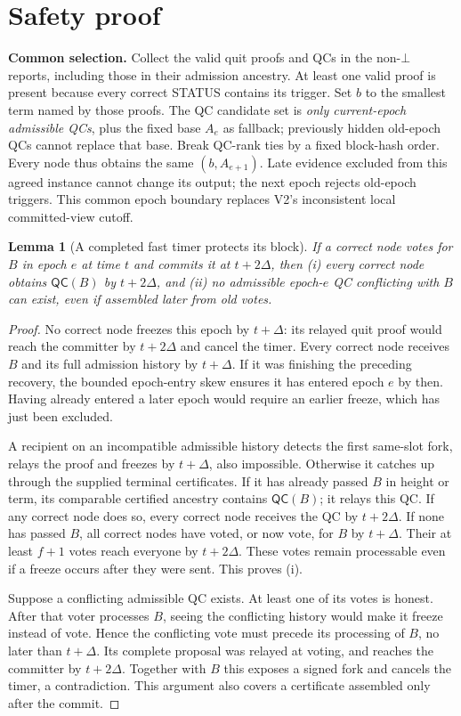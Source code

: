 \documentclass[10pt,a4paper]{article}
\newcommand{\QC}{\mathsf{QC}}
\newtheorem{lemma}{Lemma}
\begin{document}
\clearpage
\section*{Safety proof}
\textbf{Common selection.} Collect the valid quit proofs and QCs in the
non-$\bot$ reports, including those in their admission ancestry. At least one
valid proof is present because every correct STATUS contains its trigger.
Set $b$ to the smallest term named by those proofs. The QC candidate set is
\emph{only current-epoch admissible QCs}, plus the fixed base $A_e$ as fallback;
previously hidden old-epoch QCs cannot replace that base. Break QC-rank ties
by a fixed block-hash order. Every node thus obtains the same $(b,A_{e+1})$.
Late evidence excluded from this agreed instance cannot change its output;
the next epoch rejects old-epoch triggers. This common epoch boundary
replaces V2's inconsistent local committed-view cutoff.

\begin{lemma}[A completed fast timer protects its block]\label{lem:timer}
If a correct node votes for $B$ in epoch $e$ at time $t$ and commits it at
$t+2\Delta$, then (i) every correct node obtains $\QC(B)$ by $t+2\Delta$,
and (ii) no admissible epoch-$e$ QC conflicting with $B$ can exist, even if
assembled later from old votes.
\end{lemma}
\begin{proof}
No correct node freezes this epoch by $t+\Delta$: its relayed quit proof
would reach the committer by $t+2\Delta$ and cancel the timer. Every correct
node receives $B$ and its full admission history by $t+\Delta$. If it was
finishing the preceding recovery, the bounded epoch-entry skew ensures it
has entered epoch $e$ by then. Having already entered a later epoch would
require an earlier freeze, which has just been excluded.

A recipient on an incompatible admissible history detects the first
same-slot fork, relays the proof and freezes by $t+\Delta$, also impossible.
Otherwise it catches up through the supplied terminal certificates. If it
has already passed $B$ in height or term, its comparable certified ancestry
contains $\QC(B)$; it relays this QC. If any correct node does so, every
correct node receives the QC by $t+2\Delta$. If none has passed $B$, all
correct nodes have voted, or now vote, for $B$ by $t+\Delta$. Their at least
$f+1$ votes reach everyone by $t+2\Delta$. These votes remain processable
even if a freeze occurs after they were sent. This proves (i).

Suppose a conflicting admissible QC exists. At least one of its votes is
honest. After that voter processes $B$, seeing the conflicting history would
make it freeze instead of vote. Hence the conflicting vote must precede
its processing of $B$, no later than $t+\Delta$. Its complete proposal was
relayed at voting, and reaches the committer by $t+2\Delta$. Together with
$B$ this exposes a signed fork and cancels the timer, a contradiction.
This argument also covers a certificate assembled only after the commit.
\end{proof}
\end{document}
